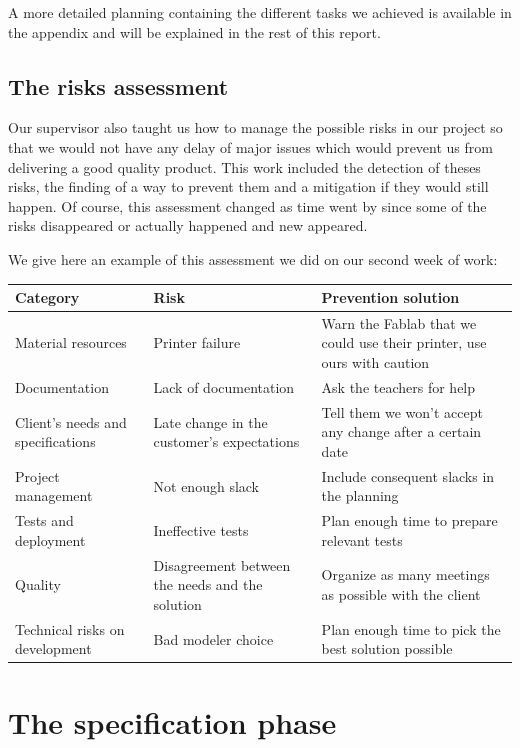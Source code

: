 \documentclass{report}
\begin{document}
A more detailed planning containing the different tasks we achieved is available in the appendix and will be explained in the rest of this report.

\section{The risks assessment}

Our supervisor also taught us how to manage the possible risks in our project so that we would not have any delay of major issues which would prevent us from delivering a good quality product. This work included the detection of theses risks, the finding of a way to prevent them and a mitigation if they would still happen. Of course, this assessment changed as time went by since some of the risks disappeared or actually happened and new appeared.

We give here an example of this assessment we did on our second week of work:

\begin{center}
	\begin{tabular}{|p{4cm}|p{5cm}|p{5cm}|}
		\hline
		Category & Risk & Prevention solution \\ \hline
		Material resources & Printer failure & Warn the Fablab that we could use their printer, use ours with caution \\
		Documentation & Lack of documentation & Ask the teachers for help \\
		Client's needs and specifications & Late change in the customer's expectations & Tell them we won't accept any change after a certain date \\
		Project management & Not enough slack & Include consequent slacks in the planning \\
		Tests and deployment & Ineffective tests & Plan enough time to prepare relevant tests \\
		Quality & Disagreement between the needs and the solution & Organize as many meetings as possible with the client \\
		Technical risks on development & Bad modeler choice & Plan enough time to pick the best solution possible \\
		\hline
	\end{tabular}
\end{center}

\chapter{The specification phase}
\end{document}
